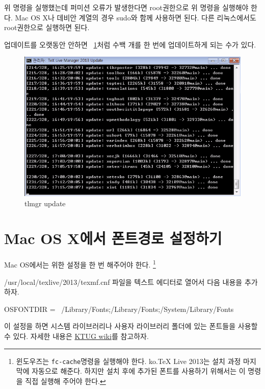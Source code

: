 \documentclass[oneside, chapter, 11pt]{oblivoir}
\begin{document}

위 명령을 실행했는데 퍼미션 오류가 발생한다면 root권한으로 위 명령을 실행해야 한다. Mac OS X나 데비안 계열의 경우 sudo와 함께 사용하면 된다. 다른 리눅스에서도 root권한으로 실행하면 된다.

업데이트를 오랫동안 안하면 \figurename~\ref{fig:update}처럼 수백 개를 한 번에 업데이트하게 되는 수가 있다.
\begin{figure}
\caption{tlmgr update}
\label{fig:update}
\includegraphics[width=\textwidth]{tlmgr-update}
\end{figure}

\section{Mac OS X에서 폰트경로 설정하기}
Mac OS에서는  위한 설정을 한 번 해주어야 한다. \footnote{윈도우즈는 \texttt{fc-cache}명령을 실행해야 한다. ko.TeX Live 2013는 설치 과정 마지막에 자동으로 해준다. 하지만 설치 후에 추가된 폰트를 사용하기 위해서는 이 명령을 직접 실행해 주어야 한다.}

/usr/local/texlive/2013/texmf.cnf 파일을 텍스트 에디터로 열어서 다음 내용을 추가하자.

\begin{pyglist}[language=bash]
OSFONTDIR = {~/Library/Fonts;/Library/Fonts;/System/Library/Fonts}
\end{pyglist}

이 설정을 하면 시스템 라이브러리나 사용자 라이브러리 폴더에 있는 폰트들을  사용할 수 있다. 
자세한 내용은 \href{http://wiki.ktug.org/wiki/wiki.php/MacOSInstall}{KTUG wiki}를 참고하자.
\end{document}
